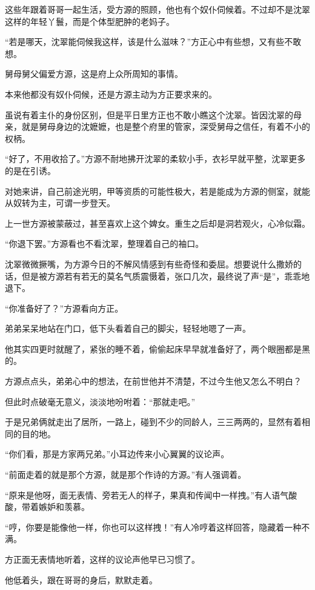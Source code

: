 \begin{this_body}
这些年跟着哥哥一起生活，受方源的照顾，他也有个奴仆伺候着。不过却不是沈翠这样的年轻丫鬟，而是个体型肥肿的老妈子。

“若是哪天，沈翠能伺候我这样，该是什么滋味？”方正心中有些想，又有些不敢想。

舅母舅父偏爱方源，这是府上众所周知的事情。

本来他都没有奴仆伺候，还是方源主动为方正要求来的。

虽说有着主仆的身份区别，但是平日里方正也不敢小瞧这个沈翠。皆因沈翠的母亲，就是舅母身边的沈嬷嬷，也是整个府里的管家，深受舅母之信任，有着不小的权柄。

“好了，不用收拾了。”方源不耐地拂开沈翠的柔软小手，衣衫早就平整，沈翠更多的是在引诱。

对她来讲，自己前途光明，甲等资质的可能性极大，若是能成为方源的侧室，就能从奴转为主，可谓一步登天。

上一世方源被蒙蔽过，甚至喜欢上这个婢女。重生之后却是洞若观火，心冷似霜。

“你退下罢。”方源看也不看沈翠，整理着自己的袖口。

沈翠微微撅嘴，为方源今日的不解风情感到有些奇怪和委屈。想要说什么撒娇的话，但是被方源若有若无的莫名气质震慑着，张口几次，最终说了声“是”，乖乖地退下。

“你准备好了？”方源看向方正。

弟弟呆呆地站在门口，低下头看着自己的脚尖，轻轻地嗯了一声。

他其实四更时就醒了，紧张的睡不着，偷偷起床早早就准备好了，两个眼圈都是黑的。

方源点点头，弟弟心中的想法，在前世他并不清楚，不过今生他又怎么不明白？

但此时点破毫无意义，淡淡地吩咐着：“那就走吧。”

于是兄弟俩就走出了居所，一路上，碰到不少的同龄人，三三两两的，显然有着相同的目的地。

“你们看，那是方家两兄弟。”小耳边传来小心翼翼的议论声。

“前面走着的就是那个方源，就是那个作诗的方源。”有人强调着。

“原来是他呀，面无表情、旁若无人的样子，果真和传闻中一样拽。”有人语气酸酸，带着嫉妒和羡慕。

“哼，你要是能像他一样，你也可以这样拽！”有人冷哼着这样回答，隐藏着一种不满。

方正面无表情地听着，这样的议论声他早已习惯了。

他低着头，跟在哥哥的身后，默默走着。


\end{this_body}
